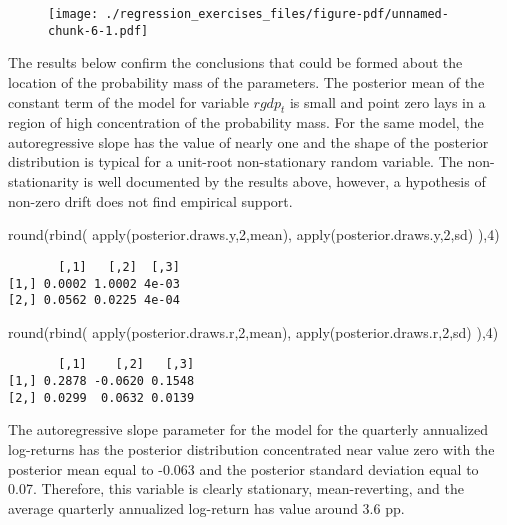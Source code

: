 \documentclass[
  letterpaper,
  DIV=11,
  numbers=noendperiod]{scrreprt}
\newenvironment{Shaded}{\begin{snugshade}}{\end{snugshade}}
\newcommand{\DecValTok}[1]{\textcolor[rgb]{0.68,0.00,0.00}{#1}}
\newcommand{\FunctionTok}[1]{\textcolor[rgb]{0.28,0.35,0.67}{#1}}
\newcommand{\NormalTok}[1]{\textcolor[rgb]{0.00,0.23,0.31}{#1}}
\begin{document}
\begin{figure}[H]

{\centering \texttt{[image: ./regression\_exercises\_files/figure-pdf/unnamed-chunk-6-1.pdf]}

}

\end{figure}

The results below confirm the conclusions that could be formed about the
location of the probability mass of the parameters. The posterior mean
of the constant term of the model for variable \(rgdp_t\) is small and
point zero lays in a region of high concentration of the probability
mass. For the same model, the autoregressive slope has the value of
nearly one and the shape of the posterior distribution is typical for a
unit-root non-stationary random variable. The non-stationarity is well
documented by the results above, however, a hypothesis of non-zero drift
does not find empirical support.

\begin{Shaded}
\begin{Highlighting}[]
\FunctionTok{round}\NormalTok{(}\FunctionTok{rbind}\NormalTok{(}
  \FunctionTok{apply}\NormalTok{(posterior.draws.y,}\DecValTok{2}\NormalTok{,mean),}
  \FunctionTok{apply}\NormalTok{(posterior.draws.y,}\DecValTok{2}\NormalTok{,sd)}
\NormalTok{),}\DecValTok{4}\NormalTok{)}
\end{Highlighting}
\end{Shaded}

\begin{verbatim}
       [,1]   [,2]  [,3]
[1,] 0.0002 1.0002 4e-03
[2,] 0.0562 0.0225 4e-04
\end{verbatim}

\begin{Shaded}
\begin{Highlighting}[]
\FunctionTok{round}\NormalTok{(}\FunctionTok{rbind}\NormalTok{(}
  \FunctionTok{apply}\NormalTok{(posterior.draws.r,}\DecValTok{2}\NormalTok{,mean),}
  \FunctionTok{apply}\NormalTok{(posterior.draws.r,}\DecValTok{2}\NormalTok{,sd)}
\NormalTok{),}\DecValTok{4}\NormalTok{)}
\end{Highlighting}
\end{Shaded}

\begin{verbatim}
       [,1]    [,2]   [,3]
[1,] 0.2878 -0.0620 0.1548
[2,] 0.0299  0.0632 0.0139
\end{verbatim}

The autoregressive slope parameter for the model for the quarterly
annualized log-returns has the posterior distribution concentrated near
value zero with the posterior mean equal to -0.063 and the posterior
standard deviation equal to 0.07. Therefore, this variable is clearly
stationary, mean-reverting, and the average quarterly annualized
log-return has value around 3.6 pp.
\end{document}

